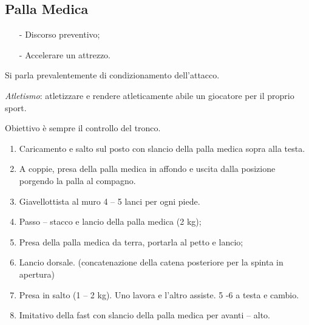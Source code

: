 \subsection{Palla Medica}
\begin{itemize}
\item[-] Discorso preventivo;
\item[-] Accelerare un attrezzo.
\end{itemize}
Si parla prevalentemente di condizionamento dell'attacco.

\begin{defi}\emph{Atletismo}: atletizzare e rendere atleticamente abile un giocatore per il proprio sport.
\end{defi}
Obiettivo è sempre il controllo del tronco.
\begin{enumerate}
\item Caricamento e salto sul posto con slancio della palla medica sopra alla testa.
\item A coppie, presa della palla medica in affondo e uscita dalla posizione porgendo la palla al
compagno.
\item Giavellottista al muro 4 – 5 lanci per ogni piede.
\item Passo – stacco e lancio della palla medica (2 kg);
\item Presa della palla medica da terra, portarla al petto e lancio;
\item Lancio dorsale. (concatenazione della catena posteriore per la spinta in apertura)
\item Presa in salto (1 – 2 kg). Uno lavora e l'altro assiste. 5 -6 a testa e cambio.
\item Imitativo della fast con slancio della palla medica per avanti – alto.
\end{enumerate}

